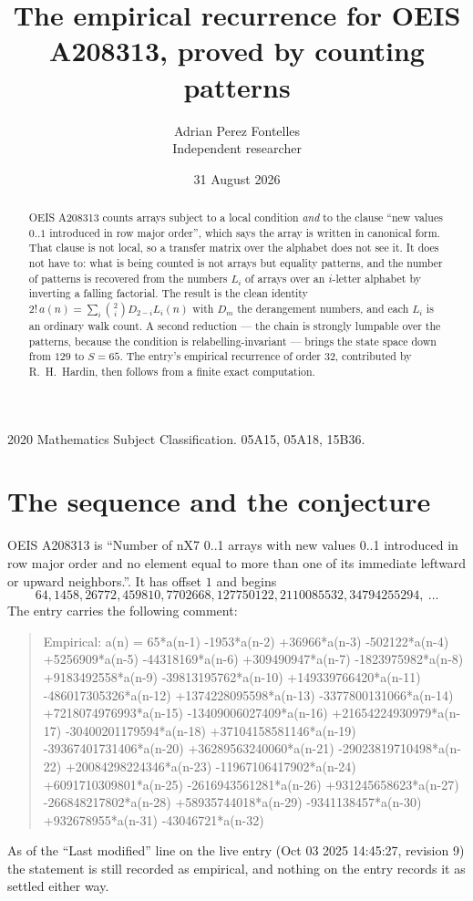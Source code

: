 \documentclass[11pt,a4paper]{article}
\title{The empirical recurrence for OEIS A208313, proved by counting patterns}
\author{Adrian Perez Fontelles\\ \small Independent researcher}
\date{31 August 2026}
\theoremstyle{plain}
\theoremstyle{definition}
\begin{document}
\maketitle

\begin{abstract}
OEIS A208313 counts arrays subject to a local condition \emph{and} to the clause ``new values
$0..1$ introduced in row major order'', which says the array is written in canonical
form. That clause is not local, so a transfer matrix over the alphabet does not see it. It
does not have to: what is being counted is not arrays but equality patterns, and the number
of patterns is recovered from the numbers $L_i$ of arrays over an $i$-letter alphabet by
inverting a falling factorial. The result is the clean identity
$2!\,a(n)=\sum_i\binom{2}{i}D_{2-i}L_i(n)$ with $D_m$ the derangement numbers,
and each $L_i$ is an ordinary walk count. A second reduction --- the chain is strongly
lumpable over the patterns, because the condition is relabelling-invariant --- brings the
state space down from $129$ to $S=65$. The entry's empirical recurrence of order
$32$, contributed by R.~H.~Hardin, then follows from a finite exact computation.
\end{abstract}

\noindent\small 2020 Mathematics Subject Classification. 05A15, 05A18, 15B36.\normalsize

\section{The sequence and the conjecture}

OEIS A208313 is ``Number of nX7 0..1 arrays with new values 0..1 introduced in row major order and no element equal to more than one of its immediate leftward or upward neighbors.''. It has offset $1$ and begins
\[
64, 1458, 26772, 459810, 7702668, 127750122, 2110085532, 34794255294,\ \dots
\]
The entry carries the following comment:
\begin{quote}\small
Empirical: a(n) = 65*a(n-1) -1953*a(n-2) +36966*a(n-3) -502122*a(n-4) +5256909*a(n-5) -44318169*a(n-6) +309490947*a(n-7) -1823975982*a(n-8) +9183492558*a(n-9) -39813195762*a(n-10) +149339766420*a(n-11) -486017305326*a(n-12) +1374228095598*a(n-13) -3377800131066*a(n-14) +7218074976993*a(n-15) -13409006027409*a(n-16) +21654224930979*a(n-17) -30400201179594*a(n-18) +37104158581146*a(n-19) -39367401731406*a(n-20) +36289563240060*a(n-21) -29023819710498*a(n-22) +20084298224346*a(n-23) -11967106417902*a(n-24) +6091710309801*a(n-25) -2616943561281*a(n-26) +931245658623*a(n-27) -266848217802*a(n-28) +58935744018*a(n-29) -9341138457*a(n-30) +932678955*a(n-31) -43046721*a(n-32)
\end{quote}
As of the ``Last modified'' line on the live entry (Oct 03 2025 14:45:27, revision 9) the statement is
still recorded as empirical, and nothing on the entry records it as settled either way.
\end{document}
